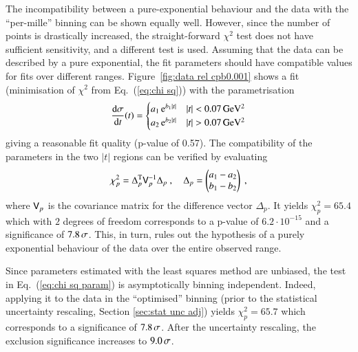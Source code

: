 
The incompatibility between a pure-exponential behaviour and the data with the ``per-mille'' binning can be shown equally well. However, since the number of points is drastically increased, the straight-forward $\chi^2$ test does not have sufficient sensitivity, and a different test is used. Assuming that the data can be described by a pure exponential, the fit parameters should have compatible values for fits over different ranges. Figure~\ref{fig:data rel cpb0.001} shows a fit (minimisation of $\chi^2$ from Eq.~(\ref{eq:chi sq})) with the parametrisation
\begin{equation}
\label{eq:split fit param}
{{\rm d}\sigma\over{\rm d}t}(t) =
\begin{cases}
a_1\, {\rm e}^{b_1 |t|} & |t| < 0.07\,{\rm GeV^2}\\
a_2\, {\rm e}^{b_2 |t|} & |t| > 0.07\,{\rm GeV^2}\\
\end{cases}
\end{equation}
giving a reasonable fit quality (p-value of 0.57). The compatibility of the parameters in the two $|t|$ regions can be verified by evaluating
\begin{equation}
\label{eq:chi sq param}
\chi_p^2 = \Delta_p^{\rm T} \mathsf{V}_p^{-1} \Delta_p\ ,\quad \Delta_p =
\begin{pmatrix}
a_1 - a_2\\
b_1 - b_2\\
\end{pmatrix}\ ,
\end{equation}
where $\mathsf{V}_p$ is the covariance matrix for the difference vector $\Delta_p$. It yields $\chi_p^2 = 65.4$ which with $2$ degrees of freedom corresponds to a p-value of $6.2\cdot10^{-15}$ and a significance of $7.8\,{\rm \sigma}$. This, in turn, rules out the hypothesis of a purely exponential behaviour of the data over the entire observed range.

Since parameters estimated with the least squares method are unbiased, the test in Eq.~(\ref{eq:chi sq param}) is asymptotically binning independent. Indeed, applying it to the data in the ``optimised'' binning (prior to the statistical uncertainty rescaling, Section \ref{sec:stat unc adj}) yields $\chi^2_p = 65.7$ which corresponds to a significance of $7.8\,{\rm \sigma}$. After the uncertainty rescaling, the exclusion significance increases to $9.0\,{\rm \sigma}$.


